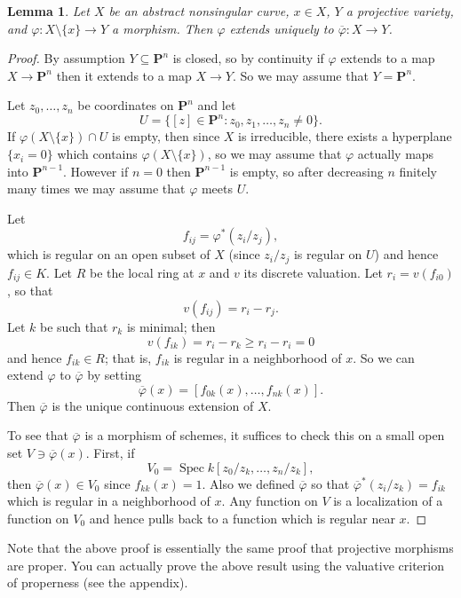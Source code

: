 \documentclass[reqno,12pt,letterpaper]{amsart}
\newcommand{\PP}{\mathbf P}
\DeclareMathOperator{\Spec}{Spec}
\newtheorem{lemma}[theorem]{Lemma}
\theoremstyle{definition}
\begin{document}
\begin{lemma}
Let $X$ be an abstract nonsingular curve, $x \in X$, $Y$ a projective variety, and $\varphi: X \setminus \{x\} \to Y$ a morphism.
Then $\varphi$ extends uniquely to $\overline \varphi: X \to Y$.
\end{lemma}
\begin{proof}
By assumption $Y \subseteq \PP^n$ is closed, so by continuity if $\varphi$ extends to a map $X \to \PP^n$ then it extends to a map $X \to Y$.
So we may assume that $Y = \PP^n$.

Let $z_0, \dots, z_n$ be coordinates on $\PP^n$ and let
$$U = \{[z] \in \PP^n: z_0, z_1, \dots, z_n \neq 0\}.$$
If $\varphi(X \setminus \{x\}) \cap U$ is empty, then since $X$ is irreducible, there exists a hyperplane $\{x_i = 0\}$ which contains $\varphi(X \setminus \{x\})$, so we may assume that $\varphi$ actually maps into $\PP^{n - 1}$.
However if $n = 0$ then $\PP^{n - 1}$ is empty, so after decreasing $n$ finitely many times we may assume that $\varphi$ meets $U$.

Let
$$f_{ij} = \varphi^*(z_i/z_j),$$
which is regular on an open subset of $X$ (since $z_i/z_j$ is regular on $U$) and hence $f_{ij} \in K$.
Let $R$ be the local ring at $x$ and $v$ its discrete valuation.
Let $r_i = v(f_{i0})$, so that
$$v(f_{ij}) = r_i - r_j.$$
Let $k$ be such that $r_k$ is minimal; then
$$v(f_{ik}) = r_i - r_k \geq r_i - r_i = 0$$
and hence $f_{ik} \in R$; that is, $f_{ik}$ is regular in a neighborhood of $x$.
So we can extend $\varphi$ to $\overline \varphi$ by setting
$$\overline \varphi(x) = [f_{0k}(x), \dots, f_{nk}(x)].$$
Then $\overline \varphi$ is the unique continuous extension of $X$.

To see that $\overline \varphi$ is a morphism of schemes, it suffices to check this on a small open set $V \ni \overline \varphi(x)$.
First, if
$$V_0 = \Spec k[z_0/z_k, \dots, z_n/z_k],$$
then $\overline \varphi(x) \in V_0$ since $f_{kk}(x) = 1$.
Also we defined $\overline \varphi$ so that $\overline \varphi^*(z_i/z_k) = f_{ik}$ which is regular in a neighborhood of $x$.
Any function on $V$ is a localization of a function on $V_0$ and hence pulls back to a function which is regular near $x$.
\end{proof}

Note that the above proof is essentially the same proof that projective morphisms are proper.
You can actually prove the above result using the valuative criterion of properness (see the appendix).
\end{document}
